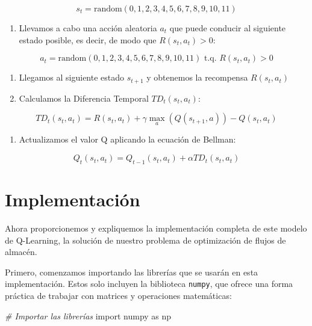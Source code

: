 \documentclass[
]{book}
\newenvironment{Shaded}{\begin{snugshade}}{\end{snugshade}}
\newcommand{\CommentTok}[1]{\textcolor[rgb]{0.56,0.35,0.01}{\textit{#1}}}
\newcommand{\ImportTok}[1]{#1}
\newcommand{\NormalTok}[1]{#1}
\providecommand{\tightlist}{%
  \setlength{\itemsep}{0pt}\setlength{\parskip}{0pt}}
\begin{document}
\[s_t = \textrm{random}(0,1,2,3,4,5,6,7,8,9,10,11)\]

\begin{enumerate}
\def\labelenumi{\arabic{enumi}.}
\setcounter{enumi}{1}
\tightlist
\item
  Llevamos a cabo una acción aleatoria \(a_t\) que puede conducir al siguiente estado posible, es decir, de modo que \(R(s_t,a_t) > 0\):
\end{enumerate}

\[a_t = \textrm{random}(0,1,2,3,4,5,6,7,8,9,10,11) \textrm{ t.q. } R(s_t,a_t) > 0\]

\begin{enumerate}
\def\labelenumi{\arabic{enumi}.}
\setcounter{enumi}{2}
\item
  Llegamos al siguiente estado \(s_{t + 1}\) y obtenemos la recompensa \(R(s_t,a_t)\)
\item
  Calculamos la Diferencia Temporal \(TD_t(s_t,a_t)\):
\end{enumerate}

\[TD_t(s_t,a_t) = R(s_t,a_t) + \gamma \underset{a}{\max}(Q(s_{t+1},a)) - Q(s_t, a_t)\]

\begin{enumerate}
\def\labelenumi{\arabic{enumi}.}
\setcounter{enumi}{4}
\tightlist
\item
  Actualizamos el valor Q aplicando la ecuación de Bellman:
\end{enumerate}

\[Q_t(s_t,a_t) = Q_{t-1}(s_t,a_t) + \alpha TD_t(s_t,a_t)\]

\hypertarget{implementaciuxf3n}{%
\section{Implementación}\label{implementaciuxf3n}}

Ahora proporcionemos y expliquemos la implementación completa de este modelo de Q-Learning, la solución de nuestro problema de optimización de flujos de almacén.

Primero, comenzamos importando las librerías que se usarán en esta implementación. Estos solo incluyen la biblioteca \texttt{numpy}, que ofrece una forma práctica de trabajar con matrices y operaciones matemáticas:

\begin{Shaded}
\begin{Highlighting}[]
\CommentTok{\# Importar las librerías}
\ImportTok{import}\NormalTok{ numpy }\ImportTok{as}\NormalTok{ np}
\end{Highlighting}
\end{Shaded}
\end{document}
